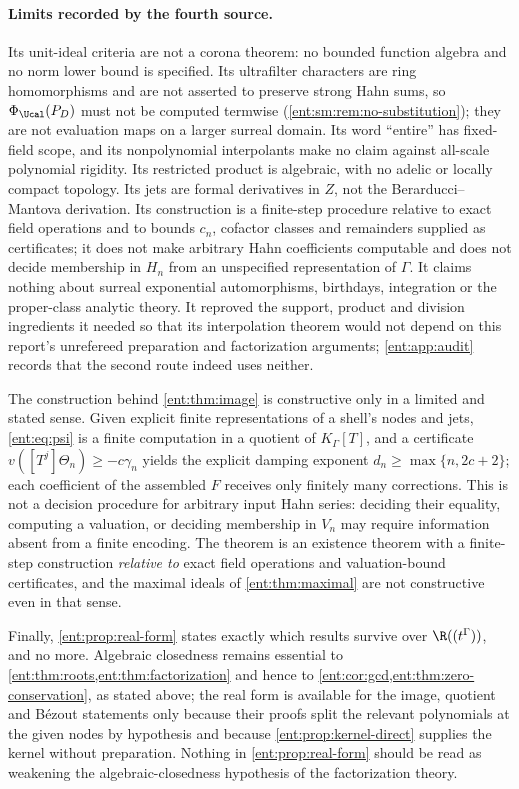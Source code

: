 \documentclass[11pt]{article}
\theoremstyle{plain}
\theoremstyle{plain}
\theoremstyle{plain}
\theoremstyle{definition}
\theoremstyle{definition}
\theoremstyle{definition}
\theoremstyle{definition}
\theoremstyle{remark}
\newcommand{\K}{K_\Gamma}\newcommand{\KD}{K_\Delta}
\begin{document}
\paragraph{Limits recorded by the fourth source.}
Its unit-ideal criteria are not a corona theorem: no bounded function algebra
and no norm lower bound is specified. Its ultrafilter characters are ring
homomorphisms and are not asserted to preserve strong Hahn sums, so
$\Phi_\Ucal(P_D)$ must not be computed termwise
(\cref{ent:sm:rem:no-substitution}); they are not evaluation maps on a larger
surreal domain. Its word ``entire'' has fixed-field scope, and its
nonpolynomial interpolants make no claim against all-scale polynomial
rigidity. Its restricted product is algebraic, with no adelic or locally
compact topology. Its jets are formal derivatives in $Z$, not the
Berarducci--Mantova derivation. Its construction is a finite-step procedure
relative to exact field operations and to bounds $c_n$, cofactor classes and
remainders supplied as certificates; it does not make arbitrary Hahn
coefficients computable and does not decide membership in $H_n$ from an
unspecified representation of $\Gamma$. It claims nothing about surreal
exponential automorphisms, birthdays, integration or the proper-class
analytic theory. It reproved the support, product and division ingredients
it needed so that its interpolation theorem would not depend on this
report's unrefereed preparation and factorization arguments;
\cref{ent:app:audit} records that the second route indeed uses neither.

The construction behind \cref{ent:thm:image} is constructive only in a
limited and stated sense. Given explicit finite representations of a shell's
nodes and jets, \eqref{ent:eq:psi} is a finite computation in a quotient of
$\K[T]$, and a certificate $v([T^j]\Theta_n)\ge-c\gamma_n$ yields the explicit
damping exponent $d_n\ge\max\{n,2c+2\}$; each coefficient of the assembled
$F$ receives only finitely many corrections. This is not a decision procedure
for arbitrary input Hahn series: deciding their equality, computing a
valuation, or deciding membership in $V_n$ may require information absent
from a finite encoding. The theorem is an existence theorem with a
finite-step construction \emph{relative to} exact field operations and
valuation-bound certificates, and the maximal ideals of
\cref{ent:thm:maximal} are not constructive even in that sense.

Finally, \cref{ent:prop:real-form} states exactly which results survive over
$\R((t^\Gamma))$, and no more. Algebraic closedness remains essential to
\cref{ent:thm:roots,ent:thm:factorization} and hence to
\cref{ent:cor:gcd,ent:thm:zero-conservation}, as stated above; the real form
is available for the image, quotient and B\'ezout statements only because
their proofs split the relevant polynomials at the given nodes by hypothesis
and because \cref{ent:prop:kernel-direct} supplies the kernel without
preparation. Nothing in \cref{ent:prop:real-form} should be read as weakening
the algebraic-closedness hypothesis of the factorization theory.
\end{document}
